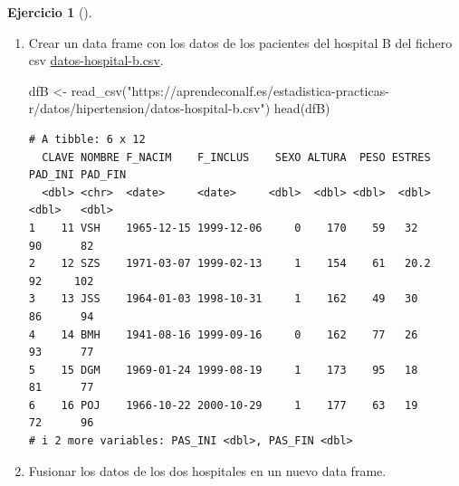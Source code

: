 \documentclass[
  spanish,
  a4paper,
]{scrreport}
\newenvironment{Shaded}{\begin{snugshade}}{\end{snugshade}}
\newcommand{\FunctionTok}[1]{\textcolor[rgb]{0.28,0.35,0.67}{#1}}
\newcommand{\NormalTok}[1]{\textcolor[rgb]{0.00,0.23,0.31}{#1}}
\newcommand{\OtherTok}[1]{\textcolor[rgb]{0.00,0.23,0.31}{#1}}
\newcommand{\StringTok}[1]{\textcolor[rgb]{0.13,0.47,0.30}{#1}}
\theoremstyle{definition}
\newtheorem{exercise}{Ejercicio}[chapter]
\theoremstyle{remark}
\begin{document}
\begin{exercise}[]
\begin{enumerate}
\begin{tcolorbox}
  \end{tcolorbox}
\item
  Crear un data frame con los datos de los pacientes del hospital B del
  fichero csv
  \href{datos/hipertension/datos-hospital-b.csv}{datos-hospital-b.csv}.

  \begin{tcolorbox}[enhanced jigsaw, titlerule=0mm, arc=.35mm, rightrule=.15mm, opacitybacktitle=0.6, leftrule=.75mm, colframe=quarto-callout-tip-color-frame, toptitle=1mm, breakable, colbacktitle=quarto-callout-tip-color!10!white, bottomrule=.15mm, colback=white, left=2mm, bottomtitle=1mm, opacityback=0, title=\textcolor{quarto-callout-tip-color}{\faLightbulb}\hspace{0.5em}{Solución}, toprule=.15mm, coltitle=black]

\begin{Shaded}
\begin{Highlighting}[]
\NormalTok{dfB }\OtherTok{\textless{}{-}} \FunctionTok{read\_csv}\NormalTok{(}\StringTok{"https://aprendeconalf.es/estadistica{-}practicas{-}r/datos/hipertension/datos{-}hospital{-}b.csv"}\NormalTok{)}
\FunctionTok{head}\NormalTok{(dfB)}
\end{Highlighting}
\end{Shaded}

\begin{verbatim}
# A tibble: 6 x 12
  CLAVE NOMBRE F_NACIM    F_INCLUS    SEXO ALTURA  PESO ESTRES PAD_INI PAD_FIN
  <dbl> <chr>  <date>     <date>     <dbl>  <dbl> <dbl>  <dbl>   <dbl>   <dbl>
1    11 VSH    1965-12-15 1999-12-06     0    170    59   32        90      82
2    12 SZS    1971-03-07 1999-02-13     1    154    61   20.2      92     102
3    13 JSS    1964-01-03 1998-10-31     1    162    49   30        86      94
4    14 BMH    1941-08-16 1999-09-16     0    162    77   26        93      77
5    15 DGM    1969-01-24 1999-08-19     1    173    95   18        81      77
6    16 POJ    1966-10-22 2000-10-29     1    177    63   19        72      96
# i 2 more variables: PAS_INI <dbl>, PAS_FIN <dbl>
\end{verbatim}

  \end{tcolorbox}
\item
  Fusionar los datos de los dos hospitales en un nuevo data frame.

  \begin{tcolorbox}[enhanced jigsaw, titlerule=0mm, arc=.35mm, rightrule=.15mm, opacitybacktitle=0.6, leftrule=.75mm, colframe=quarto-callout-tip-color-frame, toptitle=1mm, breakable, colbacktitle=quarto-callout-tip-color!10!white, bottomrule=.15mm, colback=white, left=2mm, bottomtitle=1mm, opacityback=0, title=\textcolor{quarto-callout-tip-color}{\faLightbulb}\hspace{0.5em}{Solución}, toprule=.15mm, coltitle=black]


\end{tcolorbox}
\end{enumerate}
\end{exercise}
\end{document}
